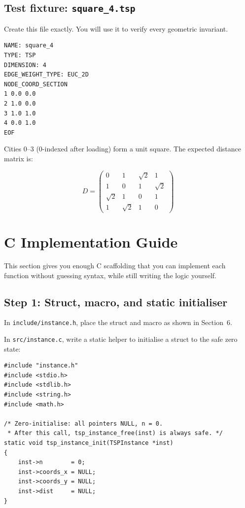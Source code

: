 \subsection{Test fixture: \texttt{square\_4.tsp}}

Create this file exactly. You will use it to verify every geometric invariant.

\begin{lstlisting}[style=cstyle, language={}, numbers=none]
NAME: square_4
TYPE: TSP
DIMENSION: 4
EDGE_WEIGHT_TYPE: EUC_2D
NODE_COORD_SECTION
1 0.0 0.0
2 1.0 0.0
3 1.0 1.0
4 0.0 1.0
EOF
\end{lstlisting}

Cities 0--3 (0-indexed after loading) form a unit square. The expected distance matrix is:

\[
D = \begin{pmatrix}
0 & 1 & \sqrt{2} & 1 \\
1 & 0 & 1 & \sqrt{2} \\
\sqrt{2} & 1 & 0 & 1 \\
1 & \sqrt{2} & 1 & 0
\end{pmatrix}
\]

\newpage

\section{C Implementation Guide}

This section gives you enough C scaffolding that you can implement each function without guessing syntax, while still writing the logic yourself.

\subsection{Step 1: Struct, macro, and static initialiser}

In \texttt{include/instance.h}, place the struct and macro as shown in Section~6.

In \texttt{src/instance.c}, write a static helper to initialise a struct to the safe zero state:

\begin{lstlisting}[style=cstyle]
#include "instance.h"
#include <stdio.h>
#include <stdlib.h>
#include <string.h>
#include <math.h>

/* Zero-initialise: all pointers NULL, n = 0.
 * After this call, tsp_instance_free(inst) is always safe. */
static void tsp_instance_init(TSPInstance *inst)
{
    inst->n        = 0;
    inst->coords_x = NULL;
    inst->coords_y = NULL;
    inst->dist     = NULL;
}
\end{lstlisting}

